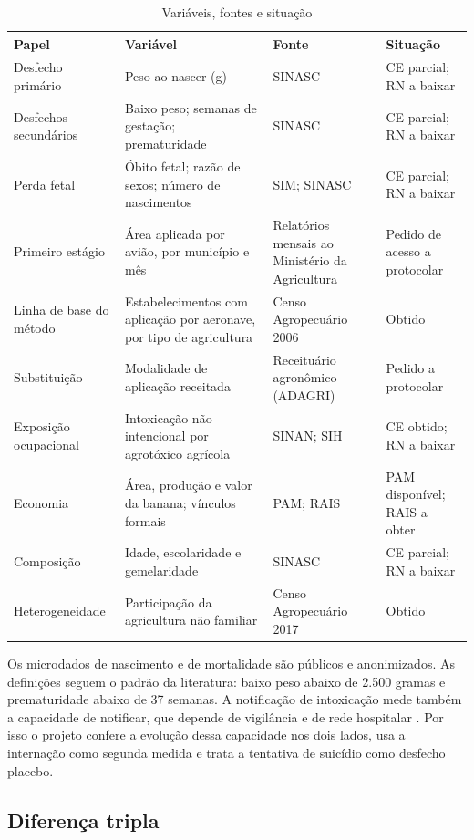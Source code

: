 \begin{table}[ht]
\centering\small
\caption{Variáveis, fontes e situação}
\label{tab:dados}
\begin{tabularx}{\textwidth}{@{}p{3.3cm}LLp{2.2cm}@{}}
\toprule
Papel & Variável & Fonte & Situação \\
\midrule
Desfecho primário & Peso ao nascer (g) & SINASC & CE parcial; RN a baixar \\
Desfechos secundários & Baixo peso; semanas de gestação; prematuridade & SINASC & CE parcial; RN a baixar \\
Perda fetal & Óbito fetal; razão de sexos; número de nascimentos & SIM; SINASC & CE parcial; RN a baixar \\
Primeiro estágio & Área aplicada por avião, por município e mês & Relatórios mensais ao Ministério da Agricultura & Pedido de acesso a protocolar \\
Linha de base do método & Estabelecimentos com aplicação por aeronave, por tipo de agricultura & Censo Agropecuário 2006 & Obtido \\
Substituição & Modalidade de aplicação receitada & Receituário agronômico (ADAGRI) & Pedido a protocolar \\
Exposição ocupacional & Intoxicação não intencional por agrotóxico agrícola & SINAN; SIH & CE obtido; RN a baixar \\
Economia & Área, produção e valor da banana; vínculos formais & PAM; RAIS & PAM disponível; RAIS a obter \\
Composição & Idade, escolaridade e gemelaridade & SINASC & CE parcial; RN a baixar \\
Heterogeneidade & Participação da agricultura não familiar & Censo Agropecuário 2017 & Obtido \\
\bottomrule
\end{tabularx}
\end{table}

Os microdados de nascimento e de mortalidade são públicos e anonimizados. As
definições seguem o padrão da literatura: baixo peso abaixo de 2.500 gramas e
prematuridade abaixo de 37 semanas. A notificação de intoxicação mede também a
capacidade de notificar, que depende de vigilância e de rede hospitalar
\cite{rodrigues2022tese}. Por isso o projeto confere a evolução dessa
capacidade nos dois lados, usa a internação como segunda medida e trata a
tentativa de suicídio como desfecho placebo.

\subsection{Diferença tripla}
\label{sec:ddd}

